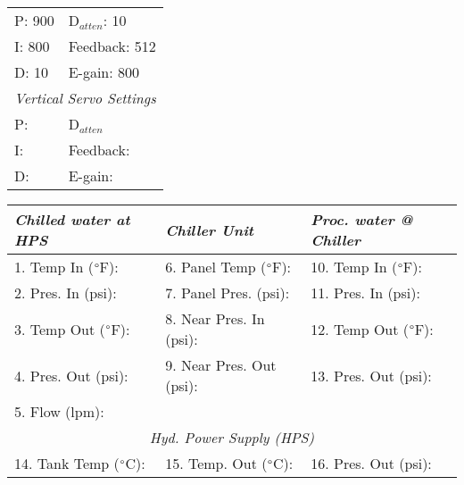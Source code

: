 \documentclass[letterpaper, 10pt]{article}
\begin{document}
\begin{table}[!ht]
        \footnotesize
        \renewcommand{\arraystretch}{1.1}
        \begin{tabular}{ p{1cm}|p{2cm} } \rowcolor[HTML]{EFEFEF}
            \multicolumn{2}{c}{\textit{Horizontal Servo Settings} \cellcolor[HTML]{EFEFEF}} \\ \hline P: 900 & D$_{atten}$: 10 \\ \hline
        I: 800 & Feedback: 512 \\ \hline 
        D: 10 & E-gain: 800 \\ \hline 
        \multicolumn{2}{c}{\textit{Vertical Servo Settings} \cellcolor[HTML]{EFEFEF}} \\ \hline 
        P:  & D$_{atten}$   \\ \hline 
        I:  & Feedback:  \\ \hline
        D:  & E-gain:  \\ \hline 
    \end{tabular} \hfill 
        \renewcommand{\arraystretch}{1.1}
        \begin{tabular}{ l|l|l } \rowcolor[HTML]{EFEFEF}
        \textit{Chilled water at HPS} & \textit{Chiller Unit} & \textit{Proc. water @ Chiller} \\ \hline 1. Temp In ($\degree$F):  & 6. Panel Temp ($\degree$F):  & 10. Temp In ($\degree$F):  \\ \hline 
    2. Pres. In (psi):  & 7. Panel Pres. (psi):  & 11. Pres. In (psi):  \\ \hline 
    3. Temp Out ($\degree$F):  & 8. Near Pres. In (psi): & 12. Temp Out ($\degree$F):  \\ \hline 
    4. Pres. Out (psi): & 9. Near Pres. Out (psi): & 13. Pres. Out (psi):  \\ \hline 
    5. Flow (lpm):  \\ \hline 
    \multicolumn{3}{c}{\textit{Hyd. Power Supply (HPS)} \cellcolor[HTML]{EFEFEF}} \\ \hline 
    14. Tank Temp ($\degree$C):  & 15. Temp. Out ($\degree$C):  & 16. Pres. Out (psi):  \\ \hline 
    \end{tabular} 
    \end{table} \vspace{-0.5cm} 
\end{document}
